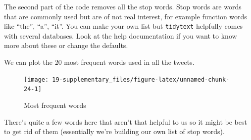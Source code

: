 \documentclass[]{book}
\newenvironment{Shaded}{\begin{snugshade}}{\end{snugshade}}
\newcommand{\CommentTok}[1]{\textcolor[rgb]{0.56,0.35,0.01}{\textit{#1}}}
\newcommand{\DataTypeTok}[1]{\textcolor[rgb]{0.13,0.29,0.53}{#1}}
\newcommand{\DecValTok}[1]{\textcolor[rgb]{0.00,0.00,0.81}{#1}}
\newcommand{\KeywordTok}[1]{\textcolor[rgb]{0.13,0.29,0.53}{\textbf{#1}}}
\newcommand{\NormalTok}[1]{#1}
\newcommand{\OperatorTok}[1]{\textcolor[rgb]{0.81,0.36,0.00}{\textbf{#1}}}
\newcommand{\OtherTok}[1]{\textcolor[rgb]{0.56,0.35,0.01}{#1}}
\newcommand{\StringTok}[1]{\textcolor[rgb]{0.31,0.60,0.02}{#1}}
\begin{document}
The second part of the code removes all the stop words. Stop words are words that are commonly used but are of not real interest, for example function words like ``the'', ``a'', ``it''. You can make your own list but \texttt{tidytext} helpfully comes with several databases. Look at the help documentation if you want to know more about these or change the defaults.

\begin{Shaded}
\end{Shaded}

We can plot the 20 most frequent words used in all the tweets.

\begin{Shaded}
\end{Shaded}

\begin{figure}

{\centering \texttt{[image: 19-supplementary\_files/figure-latex/unnamed-chunk-24-1]} 

}

\caption{Most frequent words}\label{fig:unnamed-chunk-24}
\end{figure}

There's quite a few words here that aren't that helpful to us so it might be best to get rid of them (essentially we're building our own list of stop words).
\end{document}
